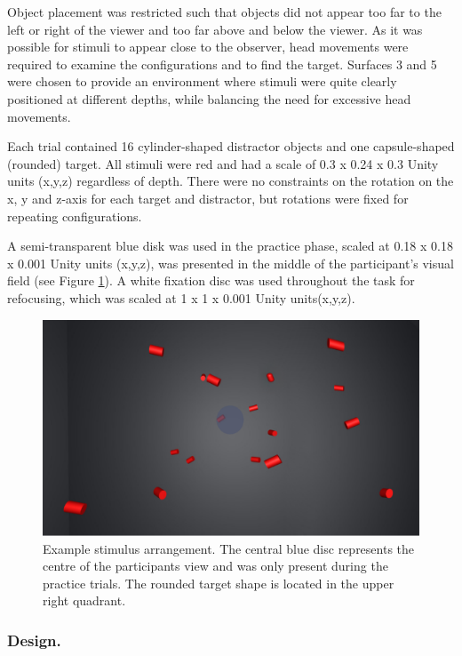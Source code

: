 \documentclass[
  man,floatsintext]{apa7}
\begin{document}
Object placement was restricted such that objects did not appear too far to the left or right of the viewer and too far above and below the viewer. As it was possible for stimuli to appear close to the observer, head movements were required to examine the configurations and to find the target. Surfaces 3 and 5 were chosen to provide an environment where stimuli were quite clearly positioned at different depths, while balancing the need for excessive head movements.

Each trial contained 16 cylinder-shaped distractor objects and one capsule-shaped (rounded) target. All stimuli were red and had a scale of 0.3 x 0.24 x 0.3 Unity units (x,y,z) regardless of depth. There were no constraints on the rotation on the x, y and z-axis for each target and distractor, but rotations were fixed for repeating configurations.

A semi-transparent blue disk was used in the practice phase, scaled at 0.18 x 0.18 x 0.001 Unity units (x,y,z), was presented in the middle of the participant's visual field (see Figure \ref{fig:task-example}). A white fixation disc was used throughout the task for refocusing, which was scaled at 1 x 1 x 0.001 Unity units(x,y,z).



\begin{figure}

{\centering \includegraphics[width=0.6\linewidth]{fig_ExampleVR} 

}

\caption{Example stimulus arrangement. The central blue disc represents the centre of the participants view and was only present during the practice trials. The rounded target shape is located in the upper right quadrant.}\label{fig:task-example}
\end{figure}

\hypertarget{design.}{%
\subsubsection{Design.}\label{design.}}
\end{document}
